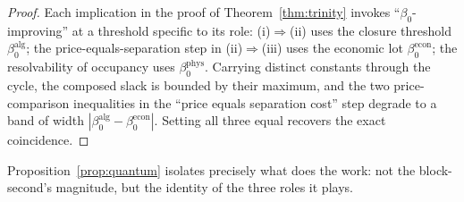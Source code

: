 \documentclass[11pt,twocolumn,a4paper]{article}
\theoremstyle{definition}
\theoremstyle{remark}
\newcommand{\blocktime}{\beta_0}
\begin{document}
\begin{proof}
Each implication in the proof of Theorem~\ref{thm:trinity} invokes ``$\blocktime$-improving'' at a threshold specific to its role: (i)$\Rightarrow$(ii) uses the closure threshold $\blocktime^{\mathrm{alg}}$; the price-equals-separation step in (ii)$\Rightarrow$(iii) uses the economic lot $\blocktime^{\mathrm{econ}}$; the resolvability of occupancy uses $\blocktime^{\mathrm{phys}}$. Carrying distinct constants through the cycle, the composed slack is bounded by their maximum, and the two price-comparison inequalities in the ``price equals separation cost'' step degrade to a band of width $|\blocktime^{\mathrm{alg}}-\blocktime^{\mathrm{econ}}|$. Setting all three equal recovers the exact coincidence.
\end{proof}

Proposition~\ref{prop:quantum} isolates precisely what does the work: not the block-second's magnitude, but the identity of the three roles it plays.
\end{document}

